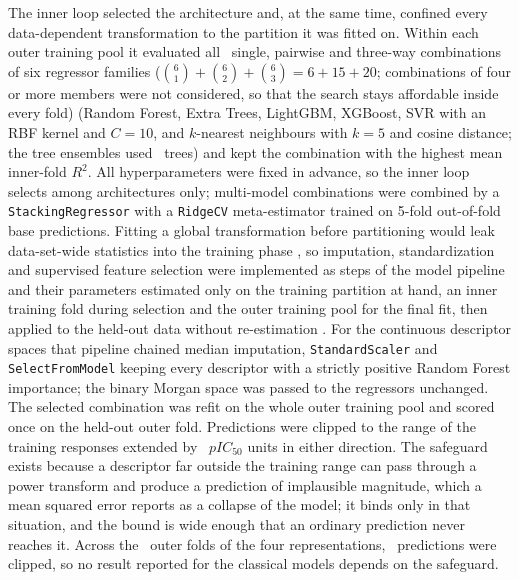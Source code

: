 The inner loop selected the architecture and, at the same time, confined every data-dependent transformation to the
partition it was fitted on. Within each outer training pool it evaluated all \NArchitectureCombos\ single, pairwise and
three-way combinations of six regressor families ($\binom{6}{1} + \binom{6}{2} + \binom{6}{3} = 6 + 15 + 20$;
combinations of four or more members were not considered, so that the search stays affordable inside every fold) (Random Forest, Extra Trees, LightGBM, XGBoost, SVR with an RBF kernel
and $C = 10$, and $k$-nearest neighbours with $k = 5$ and cosine distance; the tree ensembles used \NTrees\ trees) and kept
the combination with the highest mean inner-fold $R^2$. All hyperparameters were fixed in advance, so the inner loop
selects among architectures only; multi-model combinations were combined by a \texttt{StackingRegressor} with a
\texttt{RidgeCV} meta-estimator trained on 5-fold out-of-fold base predictions. Fitting a global transformation before
partitioning would leak data-set-wide statistics into the training phase \citep{cawley2010, varma2006}, so imputation,
standardization and supervised feature selection were implemented as steps of the model pipeline and their parameters
estimated only on the training partition at hand, an inner training fold during selection and the outer training pool
for the final fit, then applied to the held-out data without re-estimation \citep{brva2026}. For the continuous
descriptor spaces that pipeline chained median imputation, \texttt{StandardScaler} and \texttt{SelectFromModel} keeping
every descriptor with a strictly positive Random Forest importance; the binary Morgan space was passed to the
regressors unchanged. The selected combination was refit on the whole outer training pool and scored once on the
held-out outer fold. Predictions were clipped to the range of the training responses extended by \ClipMargin\ $pIC_{50}$ units in
either direction. The safeguard exists because a descriptor far outside the training range can pass through a
power transform and produce a prediction of implausible magnitude, which a mean squared error reports as a collapse of
the model; it binds only in that situation, and the bound is wide enough that an ordinary prediction never reaches it.
Across the \TotalOuterFolds\ outer folds of the four representations, \NClippedPredictions\ predictions were clipped,
so no result reported for the classical models depends on the safeguard.

